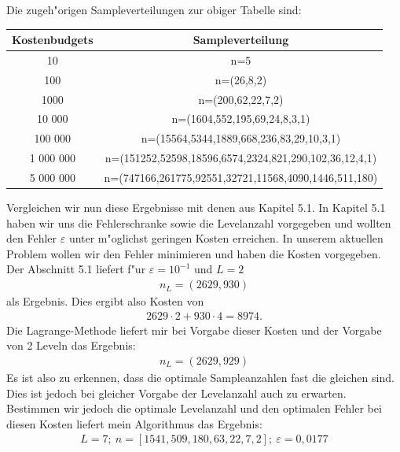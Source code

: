 Die zugeh"origen Sampleverteilungen zur obiger Tabelle sind:
\begin{center}
\begin{tabular}{|c|c|}
Kostenbudgets & Sampleverteilung \\
 \hline
10 & n=5 \\
\hline
100& n=(26,8,2) \\
\hline
1000& n=(200,62,22,7,2)\\
\hline
10 000& n=(1604,552,195,69,24,8,3,1)\\
\hline
100 000& n=(15564,5344,1889,668,236,83,29,10,3,1)\\
\hline
1 000 000& n=(151252,52598,18596,6574,2324,821,290,102,36,12,4,1)\\
\hline
5 000 000& n=(747166,261775,92551,32721,11568,4090,1446,511,180)
 \\
\end{tabular}
\end{center}\vspace{0,3cm}
Vergleichen wir nun diese Ergebnisse mit denen aus Kapitel 5.1.
In Kapitel 5.1 haben wir uns die Fehlerschranke sowie die Levelanzahl vorgegeben
und wollten den Fehler $\varepsilon$ unter m"oglichst geringen Kosten erreichen. In unserem aktuellen Problem wollen wir den Fehler minimieren und haben die Kosten vorgegeben.\\
Der Abschnitt 5.1 liefert f"ur $\varepsilon = 10^{-1}$ und $L=2$
\begin{align*}
n_L = (2629,930)
\end{align*}
als Ergebnis. Dies ergibt also Kosten von 
\begin{align*}
2629 \cdot 2+ 930 \cdot 4= 8974.
\end{align*}
Die Lagrange-Methode liefert mir bei Vorgabe dieser Kosten und der Vorgabe von 2 Leveln das Ergebnis: 
\begin{align*}
n_L=(2629,929)
\end{align*}
Es ist also zu erkennen, dass die optimale Sampleanzahlen fast die gleichen sind. Dies ist jedoch bei gleicher Vorgabe der Levelanzahl auch zu erwarten. Bestimmen wir jedoch die optimale Levelanzahl und den optimalen Fehler bei diesen Kosten liefert mein Algorithmus das Ergebnis:
\begin{align*}
L=7; \
n=[1541,509,180,63,22,7,2]; \ 
\varepsilon=0,0177
\end{align*}

